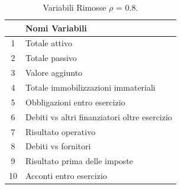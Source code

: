 \begin{table}[H]

\caption{\label{tab:table:nomivariabiliescluse} Variabili Rimosse $\rho$ = 0.8.}
\centering
\begin{tabular}[t]{cl}
\toprule
 & Nomi Variabili\\
\midrule
1 & Totale attivo\\
2 & Totale passivo\\
3 & Valore aggiunto\\
4 & Totale immobilizzazioni immateriali\\
5 & Obbligazioni entro esercizio\\
6 & Debiti vs altri finanziatori oltre esercizio\\
7 & Risultato operativo\\
8 & Debiti vs fornitori\\
9 & Risultato prima delle imposte\\
10 & Acconti entro esercizio\\
\bottomrule
\end{tabular}
\end{table}